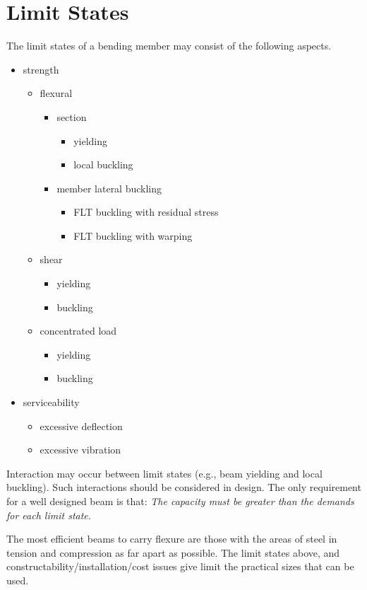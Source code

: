 \section{Limit States}
The limit states of a bending member may consist of the following aspects.
\begin{itemize}
\item strength
\begin{itemize}
\item flexural
\begin{itemize}
\item section
\begin{itemize}
\item yielding
\item local buckling
\end{itemize}
\item member lateral buckling
\begin{itemize}
\item FLT buckling with residual stress
\item FLT buckling with warping
\end{itemize}
\end{itemize}
\item shear
\begin{itemize}
\item yielding
\item buckling
\end{itemize}
\item concentrated load
\begin{itemize}
\item yielding
\item buckling
\end{itemize}
\end{itemize}
\item serviceability
\begin{itemize}
\item excessive deflection
\item excessive vibration
\end{itemize}
\end{itemize}
Interaction may occur between limit states (e.g., beam yielding and local buckling). Such interactions should be considered in design. The only requirement for a well designed beam is that: \emph{The capacity must be greater than the demands for each limit state.}

The most efficient beams to carry flexure are those with the areas of steel in tension and compression as far apart as possible. The limit states above, and constructability/installation/cost issues give limit the practical sizes that can be used.

